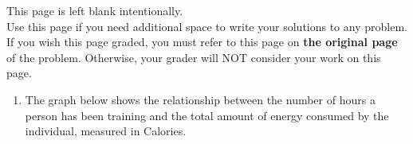 \documentclass[11pt]{article}
\begin{document}
\vfill


\newpage

This page is left blank intentionally.\\

Use this page if you need additional space to write your solutions to any problem. \\

If you wish this page graded, you must refer to this page on \textbf{the original page} of the problem. Otherwise, your grader will NOT consider your work on this page.

\newpage%


\begin{enumerate}

\item The graph below shows the relationship between the number of hours a person has been training
and the total amount of energy consumed by the individual, measured in Calories.

\begin{center}
\end{center}
\end{enumerate}
\end{document}
